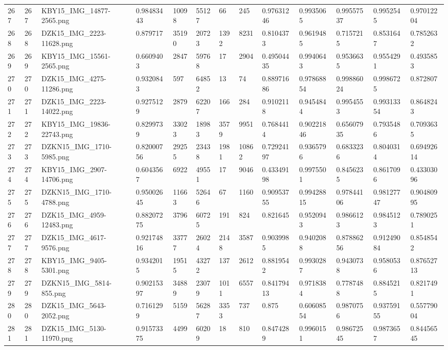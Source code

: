 \documentclass[11pt, a4paper, twoside]{report}
\begin{document}
\begin{longtable}[c]{@{}lllllllllllll@{}}
267 & 267 & KBY15\_IMG\_14877-2565.png & 0.98483443 & 10098 & 55127 & 66 & 245 & 0.97631246 & 0.9935065 & 0.99557537 & 0.9952545 & 0.97012204 \\
268 & 268 & DZK15\_IMG\_2223-11628.png & 0.879717 & 35190 & 20723 & 1392 & 8231 & 0.8104373 & 0.9619485 & 0.7157215 & 0.8531647 & 0.7852632 \\
269 & 269 & KBY15\_IMG\_15561-2565.png & 0.6609403 & 2847 & 59768 & 17 & 2904 & 0.49504435 & 0.9940643 & 0.9536635 & 0.9554291 & 0.4935853 \\
270 & 270 & DZK15\_IMG\_4275-11286.png & 0.9320843 & 597 & 64852 & 13 & 74 & 0.88971686 & 0.97868854 & 0.99886024 & 0.9986725 & 0.872807 \\
271 & 271 & DZK15\_IMG\_2223-14022.png & 0.9275129 & 2879 & 62207 & 166 & 284 & 0.9102118 & 0.9454844 & 0.9954553 & 0.99313354 & 0.8648243 \\
272 & 272 & KBY15\_IMG\_19836-22743.png & 0.8299739 & 33023 & 18983 & 3579 & 9951 & 0.7684414 & 0.90221846 & 0.65607935 & 0.7935486 & 0.7093635 \\
273 & 273 & DZKN15\_IMG\_1710-5985.png & 0.82000756 & 29255 & 23438 & 1981 & 10862 & 0.72924197 & 0.9365796 & 0.6833236 & 0.8040314 & 0.69492614 \\
274 & 274 & KBY15\_IMG\_2907-14706.png & 0.6043567 & 6922 & 49551 & 17 & 9046 & 0.43349198 & 0.9975501 & 0.8456235 & 0.8617096 & 0.43303096 \\
275 & 275 & DZKN15\_IMG\_1710-4788.png & 0.95002645 & 11663 & 52646 & 67 & 1160 & 0.90953755 & 0.99428815 & 0.97844106 & 0.98127747 & 0.90480995 \\
276 & 276 & DZK15\_IMG\_4959-12483.png & 0.88207275 & 3796 & 60725 & 191 & 824 & 0.821645 & 0.9520943 & 0.9866123 & 0.9845123 & 0.7890251 \\
277 & 277 & DZK15\_IMG\_4617-9576.png & 0.92174816 & 33777 & 26024 & 2148 & 3587 & 0.9039985 & 0.9402088 & 0.87886256 & 0.91249084 & 0.8548542 \\
278 & 278 & KBY15\_IMG\_9405-5301.png & 0.9342015 & 19515 & 43272 & 137 & 2612 & 0.8819542 & 0.9930287 & 0.9430738 & 0.9580536 & 0.87652713 \\
279 & 279 & DZKN15\_IMG\_5814-855.png & 0.90215397 & 34889 & 23079 & 1011 & 6557 & 0.84179413 & 0.9718384 & 0.7787488 & 0.8845215 & 0.8217491 \\
280 & 280 & DZK15\_IMG\_5643-2052.png & 0.7161299 & 5159 & 56287 & 3353 & 737 & 0.875 & 0.60608554 & 0.9870756 & 0.93759155 & 0.55779004 \\
281 & 281 & DZK15\_IMG\_5130-11970.png & 0.91573375 & 4499 & 60209 & 18 & 810 & 0.8474289 & 0.9960151 & 0.98672545 & 0.9873657 & 0.84456545 \\

\end{longtable}
\end{document}
